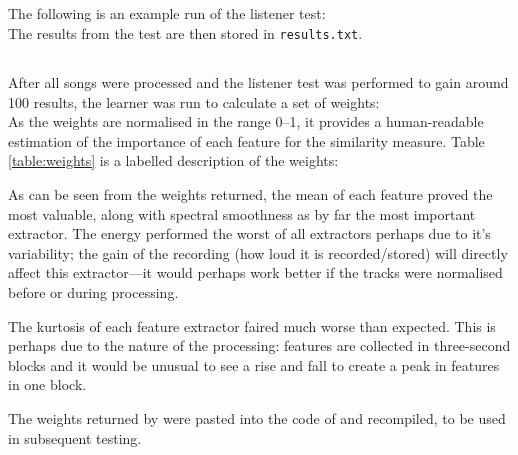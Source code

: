 \subsection{}
The following is an example run of the listener test:\\

The results from the test are then stored in \texttt{results.txt}.
\subsection{}
\label{text:testing:functional:learner}
After all songs were processed and the listener test was performed to gain around 100 results, the learner was run to calculate a set of weights:\\

As the weights are normalised in the range 0--1, it provides a human-readable estimation of the importance of each feature for the similarity measure. Table \ref{table:weights} is a labelled description of the weights:


As can be seen from the weights returned, the mean of each feature proved the most valuable, along with spectral smoothness as by far the most important extractor. The energy performed the worst of all extractors perhaps due to it's variability; the gain of the recording (how loud it is recorded/stored) will directly affect this extractor---it would perhaps work better if the tracks were normalised before or during processing.

The kurtosis of each feature extractor faired much worse than expected. This is perhaps due to the nature of the processing: features are collected in three-second blocks and it would be unusual to see a rise and fall to create a peak in features in one block.

The weights returned by  were pasted into the code of  and recompiled, to be used in subsequent testing.
\pagebreak
\subsection{}
